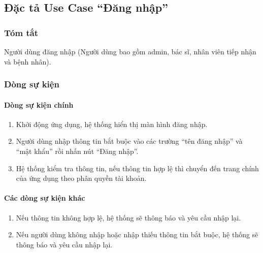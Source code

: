 \subsection{Đặc tả Use Case ``Đăng nhập''}

\subsubsection{Tóm tắt}
Người dùng đăng nhập (Người dùng bao gồm admin, bác sĩ, nhân viên tiếp nhận và bệnh nhân).

\subsubsection{Dòng sự kiện}
\paragraph{\textbf{Dòng sự kiện chính}}
\begin{enumerate}
  \item Khởi động ứng dụng, hệ thống hiển thị màn hình đăng nhập.
  \item Người dùng nhập thông tin bắt buộc vào các trường ``tên đăng nhập'' và ``mật khẩu'' rồi nhấn nút ``Đăng nhập''.
  \item Hệ thống kiểm tra thông tin, nếu thông tin hợp lệ thì chuyển đến trang chính của ứng dụng theo phân quyền tài khoản.
\end{enumerate}

\paragraph{\textbf{Các dòng sự kiện khác}}
\begin{enumerate}
  \item Nếu thông tin không hợp lệ, hệ thống sẽ thông báo và yêu cầu nhập lại.
  \item Nếu người dùng không nhập hoặc nhập thiếu thông tin bắt buộc, hệ thống sẽ thông báo và yêu cầu nhập lại.
\end{enumerate}

